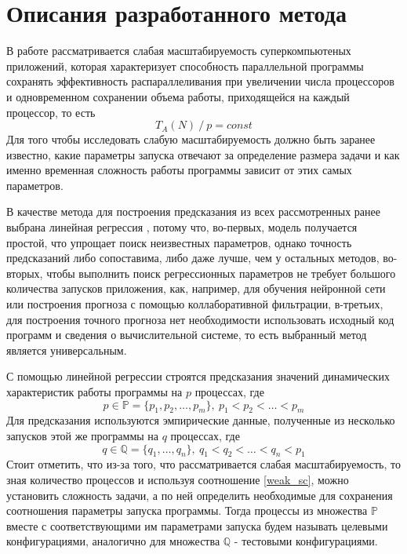 \chapter{Описания разработанного метода}
	В работе рассматривается слабая масштабируемость суперкомпьютеных приложений, которая характеризует способность параллельной программы сохранять эффективность распараллеливания при увеличении числа процессоров и одновременном сохранении объема работы, приходящейся на каждый процессор, то есть
	\begin{equation}\label{weak_sc}
	T_A(N)\:/\:p = const
	\end{equation}
	Для того чтобы исследовать слабую масштабируемость должно быть заранее известно, какие параметры запуска отвечают за определение размера задачи и как именно временная сложность работы программы зависит от этих самых параметров.

	В качестве метода для построения предсказания из всех рассмотренных ранее выбрана линейная регрессия%
	, потому что, во-первых, модель получается простой, что упрощает поиск неизвестных параметров, однако точность предсказаний либо сопоставима, либо даже лучше, чем у остальных методов, во-вторых, чтобы выполнить поиск регрессионных параметров не требует большого количества запусков приложения, как, например, для обучения нейронной сети или построения прогноза с помощью коллаборативной фильтрации, в-третьих, для построения точного прогноза нет необходимости использовать исходный код программ и сведения о вычислительной системе, то есть выбранный метод является универсальным.%

	С помощью линейной регрессии строятся предсказания значений динамических характеристик работы программы на \(p\) процессах, где \[p \in \mathbb{P} = \{p_1, p_2, \ldots, p_m \},\ p_1 < p_2 < \ldots < p_m\] Для предсказания используются эмпирические данные, полученные из несколько запусков этой же программы на \(q\) процессах, где \[q \in \mathbb{Q} = \{q_1,\ldots, q_n\},\ q_1 < q_2 < \ldots < q_n < p_1\] Стоит отметить, что из-за того, что рассматривается слабая масштабируемость, то зная количество процессов и используя соотношение \eqref{weak_sc}, можно установить сложность задачи, а по ней определить необходимые для сохранения соотношения параметры запуска программы. Тогда процессы из множества \(\mathbb{P}\) вместе с соответствующими им параметрами запуска будем называть целевыми конфигурациями, аналогично для множества \(\mathbb{Q}\) - тестовыми конфигурациями.

